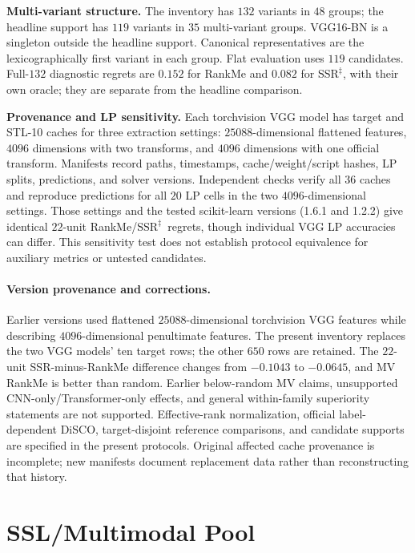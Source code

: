 \documentclass{article}
\newcommand{\SSRdag}{\ensuremath{\mathrm{SSR}^{\ddagger}}\xspace}
\begin{document}
\textbf{Multi-variant structure.} The inventory has $132$ variants in $48$ groups; the headline support has $119$ variants in $35$ multi-variant groups. VGG16-BN is a singleton outside the headline support. Canonical representatives are the lexicographically first variant in each group. Flat evaluation uses $119$ candidates. Full-$132$ diagnostic regrets are $0.152$ for RankMe and $0.082$ for \SSRdag, with their own oracle; they are separate from the headline comparison.

\textbf{Provenance and LP sensitivity.} Each torchvision VGG model has target and STL-10 caches for three extraction settings: $25088$-dimensional flattened features, $4096$ dimensions with two transforms, and $4096$ dimensions with one official transform. Manifests record paths, timestamps, cache/weight/script hashes, LP splits, predictions, and solver versions. Independent checks verify all $36$ caches and reproduce predictions for all $20$ LP cells in the two $4096$-dimensional settings. Those settings and the tested scikit-learn versions (1.6.1 and 1.2.2) give identical $22$-unit RankMe/\SSRdag\ regrets, though individual VGG LP accuracies can differ. This sensitivity test does not establish protocol equivalence for auxiliary metrics or untested candidates.

\paragraph{Version provenance and corrections.}
Earlier versions used flattened $25088$-dimensional torchvision VGG features while describing $4096$-dimensional penultimate features. The present inventory replaces the two VGG models' ten target rows; the other $650$ rows are retained. The $22$-unit SSR-minus-RankMe difference changes from $-0.1043$ to $-0.0645$, and MV RankMe is better than random. Earlier below-random MV claims, unsupported CNN-only/Transformer-only effects, and general within-family superiority statements are not supported. Effective-rank normalization, official label-dependent DiSCO, target-disjoint reference comparisons, and candidate supports are specified in the present protocols. Original affected cache provenance is incomplete; new manifests document replacement data rather than reconstructing that history.

\section{SSL/Multimodal Pool}
\label{app:ssl_pool}
\end{document}
